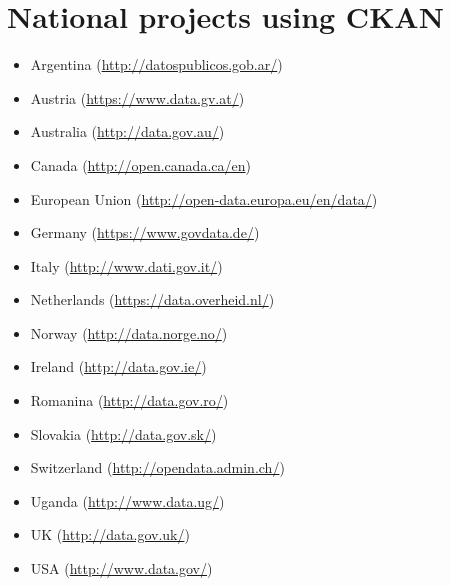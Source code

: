 \documentclass{article}
\begin{document}
\appendix

\section{National \cite{open-data} projects using CKAN}

\begin{itemize}
    \item Argentina (\url{http://datospublicos.gob.ar/})
    \item Austria   (\url{https://www.data.gv.at/})
    \item Australia (\url{http://data.gov.au/})
    \item Canada (\url{http://open.canada.ca/en})
    \item European Union (\url{http://open-data.europa.eu/en/data/})
    \item Germany (\url{https://www.govdata.de/})
    \item Italy (\url{http://www.dati.gov.it/})
    \item Netherlands (\url{https://data.overheid.nl/})
    \item Norway (\url{http://data.norge.no/})
    \item Ireland (\url{http://data.gov.ie/})
    \item Romanina (\url{http://data.gov.ro/})
    \item Slovakia (\url{http://data.gov.sk/})
    \item Switzerland (\url{http://opendata.admin.ch/})
    \item Uganda (\url{http://www.data.ug/})
    \item UK (\url{http://data.gov.uk/})
    \item USA (\url{http://www.data.gov/})
\end{itemize}

%
%

\printbibliography
\end{document}
